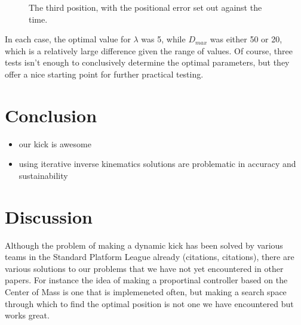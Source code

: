 \documentclass[a4paper]{article}
\begin{document}
\begin{figure}[htbp]
  \centering
  \caption{The third position, with the positional error set out against
         the time.}
  \label{fig:ik_plot3}
\end{figure}
\FloatBarrier

In each case, the optimal value for $\lambda$ was 5, while $D_{max}$ was either
50 or 20, which is a relatively large difference given the range of values. Of
course, three tests isn't enough to conclusively determine the optimal
parameters, but they offer a nice starting point for further practical testing.

\section{Conclusion}
\begin{itemize}
    \item our kick is awesome
    \item using iterative inverse kinematics solutions are problematic in
        accuracy and sustainability
\end{itemize}

\section{Discussion}
Although the problem of making a dynamic kick has been solved by various teams
in the Standard Platform League already (citations, citations), there are various solutions to our
problems that we have not yet encountered in other papers. For instance the idea
of making a proportinal controller based on the Center of Mass is one that is
implemeneted often, but making a search space through which to find the optimal
position is not one we have encountered but works great.
\end{document}
